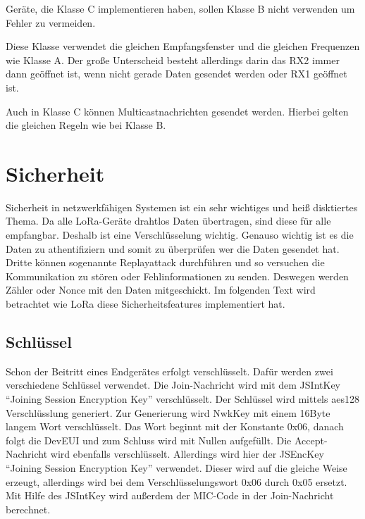 \documentclass[a4paper, 12pt]{article}
\begin{document}
            Geräte, die Klasse C implementieren haben, sollen Klasse B nicht verwenden um Fehler zu vermeiden.

            Diese Klasse verwendet die gleichen Empfangsfenster und die gleichen Frequenzen wie Klasse A. Der große 
            Unterscheid besteht allerdings darin das RX2 immer dann geöffnet ist, wenn nicht gerade Daten gesendet 
            werden oder RX1 geöffnet ist. 

            Auch in Klasse C können Multicastnachrichten gesendet werden. Hierbei gelten die gleichen 
            Regeln wie bei Klasse B.

    \section{Sicherheit} \label{sec:Sicherheit}  
        Sicherheit in netzwerkfähigen Systemen ist ein sehr wichtiges und heiß disktiertes Thema. Da alle LoRa-Geräte 
        drahtlos Daten übertragen, sind diese für alle empfangbar. Deshalb ist eine Verschlüsselung wichtig.
        Genauso wichtig ist es die Daten zu athentifiziern und somit zu überprüfen wer die Daten gesendet hat. 
        Dritte können sogenannte Replayattack durchführen und so versuchen die Kommunikation zu stören oder 
        Fehlinformationen zu senden. Deswegen werden Zähler oder Nonce mit den Daten mitgeschickt. 
        Im folgenden Text wird betrachtet wie LoRa diese Sicherheitsfeatures implementiert hat.

        \subsection{Schlüssel}
            Schon der Beitritt eines Endgerätes erfolgt verschlüsselt. Dafür werden zwei verschiedene Schlüssel 
            verwendet. Die Join-Nachricht wird mit dem JSIntKey ``Joining Session Encryption Key'' verschlüsselt. Der 
            Schlüssel wird mittels aes128 Verschlüsslung generiert. 
            Zur Generierung wird NwkKey mit einem 16Byte langem Wort verschlüsselt. Das Wort beginnt 
            mit der Konstante 0x06, danach folgt die DevEUI und zum Schluss wird mit Nullen aufgefüllt. 
            Die Accept-Nachricht wird ebenfalls verschlüsselt. Allerdings wird 
            hier der JSEncKey ``Joining Session Encryption Key'' verwendet. Dieser wird auf die gleiche Weise erzeugt, 
            allerdings wird bei dem Verschlüsselungswort 0x06 durch 0x05 ersetzt. 
            Mit Hilfe des JSIntKey wird außerdem der MIC-Code in der Join-Nachricht berechnet.
\end{document}
